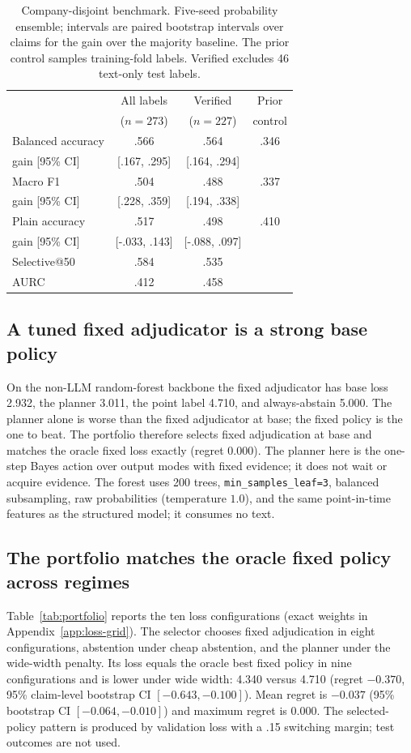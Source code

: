 \documentclass[11pt]{article}
\begin{document}
\begin{table}[t]
\centering
\small
\setlength{\tabcolsep}{3pt}
\begin{tabular}{lccc}
\toprule
 & All labels & Verified & Prior \\
 & ($n=273$) & ($n=227$) & control \\
\midrule
Balanced accuracy & .566 & .564 & .346 \\
\quad gain [95\% CI] & [.167, .295] & [.164, .294] & \\
Macro F1 & .504 & .488 & .337 \\
\quad gain [95\% CI] & [.228, .359] & [.194, .338] & \\
Plain accuracy & .517 & .498 & .410 \\
\quad gain [95\% CI] & [-.033, .143] & [-.088, .097] & \\
Selective@50 & .584 & .535 & \\
AURC & .412 & .458 & \\
\bottomrule
\end{tabular}
\caption{Company-disjoint benchmark. Five-seed probability ensemble; intervals are paired bootstrap intervals over claims for the gain over the majority baseline. The prior control samples training-fold labels. Verified excludes 46 text-only test labels.}
\label{tab:benchmark}
\end{table}

\subsection{A tuned fixed adjudicator is a strong base policy}
On the non-LLM random-forest backbone the fixed adjudicator has base loss 2.932, the planner 3.011, the point label 4.710, and always-abstain 5.000. The planner alone is worse than the fixed adjudicator at base; the fixed policy is the one to beat. The portfolio therefore selects fixed adjudication at base and matches the oracle fixed loss exactly (regret 0.000). The planner here is the one-step Bayes action over output modes with fixed evidence; it does not wait or acquire evidence. The forest uses 200 trees, \texttt{min\_samples\_leaf=3}, balanced subsampling, raw probabilities (temperature $1.0$), and the same point-in-time features as the structured model; it consumes no text.

\subsection{The portfolio matches the oracle fixed policy across regimes}
\label{sec:regret-results}
Table~\ref{tab:portfolio} reports the ten loss configurations (exact weights in Appendix~\ref{app:loss-grid}). The selector chooses fixed adjudication in eight configurations, abstention under cheap abstention, and the planner under the wide-width penalty. Its loss equals the oracle best fixed policy in nine configurations and is lower under wide width: 4.340 versus 4.710 (regret \(-0.370\), 95\% claim-level bootstrap CI \([-0.643,-0.100]\)). Mean regret is \(-0.037\) (95\% bootstrap CI \([-0.064,-0.010]\)) and maximum regret is \(0.000\). The selected-policy pattern is produced by validation loss with a .15 switching margin; test outcomes are not used.
\end{document}
